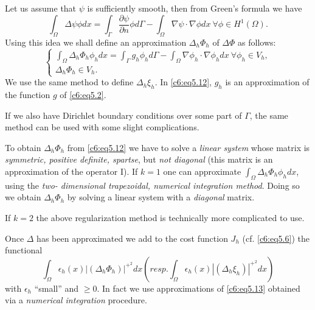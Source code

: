 Let us assume that $\psi$ is sufficiently smooth, then from Green's 
formula we have  
\begin{equation}
\int_\Omega \Delta \psi \phi dx = \int_\Gamma \frac{\partial 
\psi}{\partial n} \phi d \Gamma - \int_\Omega \nabla \psi \cdot 
\nabla \phi dx ~ \forall \phi \in H^1 (\Omega ). 
\tag{5.11}\label{c6:eq5.11}   
\end{equation}
Using this idea we shall define an approximation $\Delta_h \Phi_h$ of 
$\Delta \Phi$ as follows: 
\begin{equation}
\begin{cases}
\int_\Omega \Delta_h \Phi_h \phi_h dx = \int_\Gamma g_h \phi_h d\Gamma 
- \int_\Omega \nabla \phi_h \cdot \nabla \phi_h dx ~ 
\forall \phi_h \in V_h,\\  
\Delta_h \Phi_h \in V_h. 
\end{cases} \tag{5.12}\label{c6:eq5.12}
\end{equation}
We use the same method to define $\Delta_h \xi_h$. In 
\eqref{c6:eq5.12}, $g_h$ is an approximation of the function $g$ of 
\eqref{c6:eq5.2}.  

\begin{remark}\label{c6:rem5.6}%
If we also have Dirichlet boundary conditions over some part of 
$\Gamma$, the same  method can be used with some slight complications. 
\end{remark}

\begin{remark}\label{c6:rem5.7}%
To obtain $\Delta_h \Phi_h$ from \eqref{c6:eq5.12} we have to solve a 
{\em linear system} whose matrix is {\em symmetric, positive definite, 
spartse}, but {\em not diagonal} (this matrix is an approximation of 
the operator I). If $k = 1$ one can approximate $\int_\Omega \Delta_h 
\Phi_h \phi_h dx$, using the {\em two- dimensional trapezoidal, 
numerical integration method}. Doing so we obtain $\Delta_h \Phi_h$ by 
solving a linear system with a {\em diagonal} matrix.        
\end{remark}
If $k=2$ the above regularization method is technically more 
complicated to use.  

Once $\Delta$ has been approximated we add to the cost function $J_h $ 
(cf. \eqref{c6:eq5.6}) the functional  
\begin{equation}
\int_\Omega \epsilon_h (x) | (\Delta_h \Phi_h )|^{+^2} dx (resp. 
\int_\Omega \epsilon_h (x) | (\Delta_h \xi_h )|^{+^2} dx) 
\tag{5.13}\label{c6:eq5.13}  
\end{equation}
with $\epsilon_h$ ``small'' and $\geq 0$. In fact we use 
approximations of \eqref{c6:eq5.13} obtained via a {\em numerical 
integration} procedure.   

